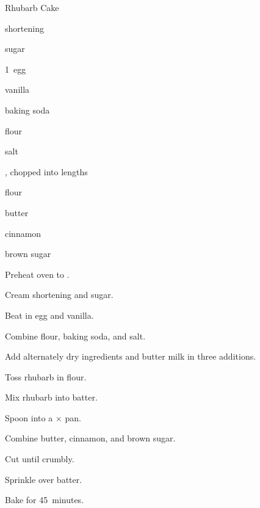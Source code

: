 \begin{recipe}{Rhubarb Cake}{}{}

\begin{ingredients}
\item \C{\half} shortening
\item \C{1\half} sugar
\item 1~egg
\item {} vanilla
\item {} baking soda
\item {} flour
\item \tp{\half} salt
\item {} 
\item \C{2\quarter} , chopped into \inch{\half} lengths
\item {} flour
\item \C{\quarter} butter
\item {} cinnamon
\item {} brown sugar
\end{ingredients}

\begin{directions}
\item Preheat oven to .
\item Cream shortening and sugar.
\item Beat in egg and vanilla.
\item Combine  flour, baking soda, and salt.
\item Add alternately dry ingredients and butter milk in three additions.
\item Toss rhubarb in  flour.
\item Mix rhubarb into batter.
\item Spoon into a $\times$ pan.
\item Combine butter, cinnamon, and brown sugar.
\item Cut until crumbly.
\item Sprinkle over batter.
\item Bake for 45~minutes.
\end{directions}

\end{recipe}
